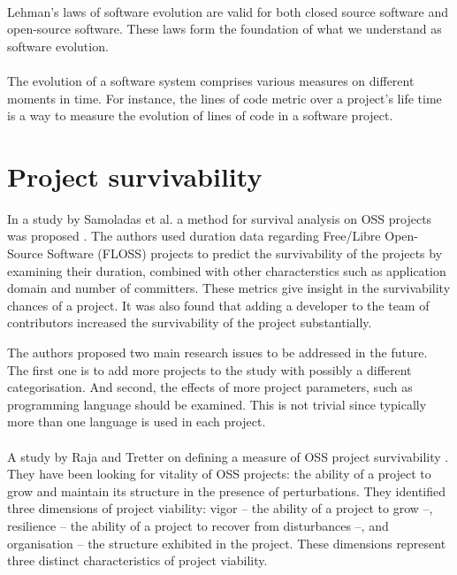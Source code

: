 \paragraph{}
Lehman's laws of software evolution are valid for both closed source software
and open-source software. These laws form the foundation of what we understand
as software evolution.

\paragraph{}
The evolution of a software system comprises various measures on different
moments in time. For instance, the lines of code metric over a project's life
time is a way to measure the evolution of lines of code in a software project.



\section{Project survivability}
In a study by Samoladas et al. a method for survival analysis on OSS projects
was proposed \cite{samoladas2010}. The authors used duration data regarding
Free/Libre Open-Source Software (FLOSS) projects to predict the survivability of
the projects by examining their duration, combined with other characterstics
such as application domain and number of committers. These metrics give insight
in the survivability chances of a project. It was also found that adding a
developer to the team of contributors increased the survivability of the
project substantially.

The authors proposed two main research issues to be addressed in the future. The
first one is to add more projects to the study with possibly a different
categorisation. And second, the effects of more project parameters, such as
programming language should be examined. This is not trivial since typically
more than one language is used in each project.

\paragraph{}
A study by Raja and Tretter on defining a measure of OSS project survivability
\cite{raja2012}.
They have been looking for vitality of OSS projects: the ability of a project
to grow and maintain its structure in the presence of perturbations. They
identified three dimensions of project viability: vigor -- the ability of a
project to grow --, resilience -- the ability of a project to recover from
disturbances --, and organisation -- the structure exhibited in the project.
These dimensions represent three distinct characteristics of project viability.

